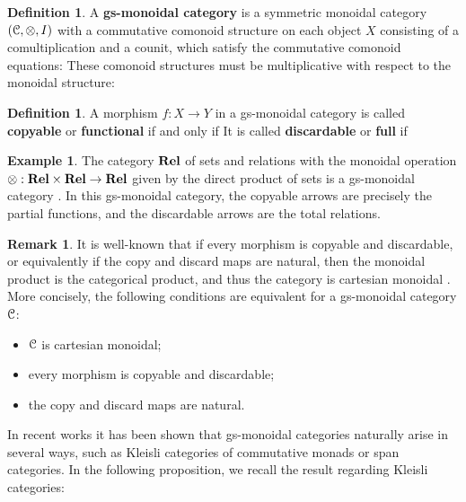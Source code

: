 \documentclass[a4paper,UKenglish,numberwithinsect,cleveref, autoref, thm-restate]{lipics-v2021}
\theoremstyle{plain} %
\theoremstyle{definition} %
\newtheorem{mydefinition}[mytheorem]{Definition}
\newtheorem{myremark}[mytheorem]{Remark}
\newtheorem{myexample}[mytheorem]{Example}
\begin{document}
\begin{mydefinition}
A \textbf{gs-monoidal category} is a symmetric monoidal category $(\mathcal{C}, \otimes, I)$
with a commutative comonoid structure on each object $X$ consisting of a comultiplication
and a counit,
which satisfy the commutative comonoid equations:
These comonoid structures must be multiplicative with respect to the monoidal structure:

\end{mydefinition}



\begin{mydefinition}
 A morphism $f:X\to Y$ in a gs-monoidal category is called \textbf{copyable} or \textbf{functional} if and only if
 It is called \textbf{discardable} or \textbf{full} if 
\end{mydefinition}

\begin{myexample}
The category $\mathbf{Rel}$ of sets and relations with the monoidal operation $\otimes : \mathbf{Rel} \times \mathbf{Rel}\to \mathbf{Rel}$ given by the direct product of sets is a gs-monoidal category \cite{CorradiniGadducci02}. In this gs-monoidal category, the copyable arrows are precisely the partial functions, and the discardable arrows are the total relations.
\end{myexample}

\begin{myremark}
It is well-known that if every morphism is copyable and discardable, or equivalently if the copy and discard maps are natural, then the monoidal product is the categorical product, and thus the category is cartesian monoidal \cite{Fox:CACC}.
More concisely, the following conditions are equivalent for a gs-monoidal category $\mathcal{C}$:
 \begin{itemize}
  \item $\mathcal{C}$ is cartesian monoidal;
  \item every morphism is copyable and discardable;
  \item the copy and discard maps are natural.
 \end{itemize}
\end{myremark}

In recent works \cite{tba}
it has been shown that gs-monoidal categories naturally arise in several ways, such as Kleisli categories of commutative monads or span categories. In the following proposition, we recall the result regarding Kleisli categories:
\end{document}
